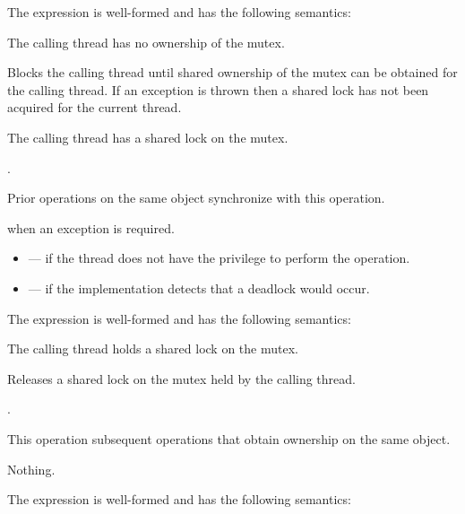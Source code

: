 \pnum
The expression  is well-formed and has the
following semantics:

\begin{itemdescr}
\pnum
\expects
The calling thread has no ownership of the mutex.

\pnum
{}%
\effects
Blocks the calling thread until shared ownership of the mutex can be obtained for the calling thread.
If an exception is thrown then a shared lock has not been acquired for the current thread.

\pnum
\ensures
The calling thread has a shared lock on the mutex.

\pnum
\returntype {}.

\pnum
\sync
Prior  operations on the same object synchronize with this operation.

\pnum
\throws
{} when an exception is required.

\pnum
\errors
\begin{itemize}
\item {} --- if the thread does not have the privilege to perform the operation.
\item {} --- if the implementation detects that a deadlock would occur.
\end{itemize}
\end{itemdescr}

\pnum
The expression  is well-formed and has the following semantics:

\begin{itemdescr}
\pnum
\expects
The calling thread holds a shared lock on the mutex.

\pnum
\effects
Releases a shared lock on the mutex held by the calling thread.

\pnum
\returntype {}.

\pnum
\sync
This operation  subsequent
 operations that obtain ownership on the same object.

\pnum
\throws
Nothing.
\end{itemdescr}

\pnum
The expression  is well-formed and has the following semantics:

